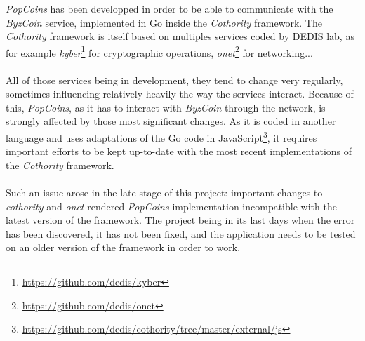 \textit{PopCoins} has been developped in order to be able to communicate with the \textit{ByzCoin} service, implemented in Go inside the \textit{Cothority} framework. The \textit{Cothority} framework is itself based on multiples services coded by DEDIS lab, as for example \textit{kyber}\footnote{\url{https://github.com/dedis/kyber}} for cryptographic operations, \textit{onet}\footnote{\url{https://github.com/dedis/onet}} for networking...

\paragraph{}

All of those services being in development, they tend to change very regularly, sometimes influencing relatively heavily the way the services interact. Because of this, \textit{PopCoins}, as it has to interact with \textit{ByzCoin} through the network, is strongly affected by those most significant changes. As it is coded in another language and uses adaptations of the Go code in JavaScript\footnote{\url{https://github.com/dedis/cothority/tree/master/external/js}}, it requires important efforts to be kept up-to-date with the most recent implementations of the \textit{Cothority} framework.

\paragraph{}

Such an issue arose in the late stage of this project: important changes to \textit{cothority} and \textit{onet} rendered \textit{PopCoins} implementation incompatible with the latest version of the framework. The project being in its last days when the error has been discovered, it has not been fixed, and the application needs to be tested on an older version of the framework in order to work.
